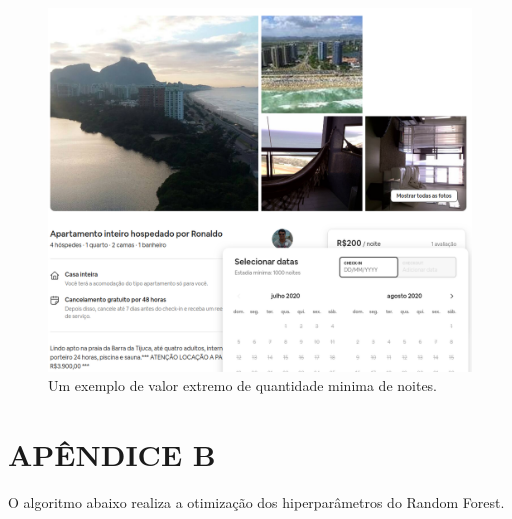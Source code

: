 \documentclass[
]{book}
\begin{document}
\begin{figure}
\centering
\includegraphics[width=\textwidth,height=0.5\textheight]{../fig/exemplo_periodo_airbnb.png}
\caption{Um exemplo de valor extremo de quantidade minima de
noites.\label{fig:minima_noites}}
\end{figure}

\hypertarget{apuxeandice-b}{%
\chapter*{APÊNDICE B}\label{apuxeandice-b}}

O algoritmo abaixo realiza a otimização dos hiperparâmetros do Random
Forest.
\end{document}
